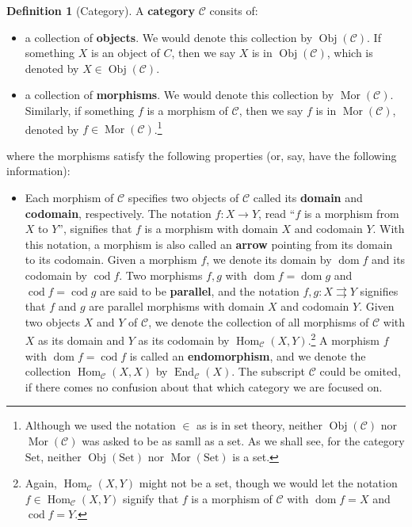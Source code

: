 \documentclass{article}
\theoremstyle{definition}
\newtheorem{definition}{Definition}[section]
\theoremstyle{definition}
\theoremstyle{remark}
\DeclareMathOperator{\Obj}{Obj}
\DeclareMathOperator{\Mor}{Mor}
\DeclareMathOperator{\dom}{dom}
\DeclareMathOperator{\cod}{cod}
\DeclareMathOperator{\Hom}{Hom}
\DeclareMathOperator{\End}{End}
\begin{document}
	\begin{definition}[Category]
	A \textbf{category} $\mathcal{C}$ consits of:
		\begin{itemize}
			\item a collection of \textbf{objects}. We would denote this collection by $\Obj(\mathcal{C})$. If something $X$ is an object of $C$, then we say $X$ is in $\Obj(\mathcal{C})$, which is denoted by $X\in\Obj(\mathcal{C})$.
			\item a collection of \textbf{morphisms}. We would denote this collection by $\Mor(\mathcal{C})$. Similarly, if something $f$ is a morphism of $\mathcal{C}$, then we say $f$ is in $\Mor(\mathcal{C})$, denoted by $f\in \Mor(\mathcal{C})$.\footnote{Although we used the notation $\in$ as is in set theory, neither $\Obj(\mathcal{C})$ nor $\Mor(\mathcal{C})$ was asked to be as samll as a set. As we shall see, for the category $\mathrm{Set}$, neither $\Obj(\mathrm{Set})$ nor $\Mor(\mathrm{Set})$ is a set.}
		\end{itemize}
	where the morphisms satisfy the following properties (or, say, have the following information):
		\begin{itemize}
			\item Each morphism of $\mathcal{C}$ specifies two objects of $\mathcal{C}$ called its \textbf{domain} and \textbf{codomain}, respectively. The notation $f:X\to Y$, read ``$f$ is a morphism from $X$ to $Y$'', signifies that $f$ is a morphism with domain $X$ and codomain $Y$. With this notation, a morphism is also called an \textbf{arrow} pointing from its domain to its codomain. Given a morphism $f$, we denote its domain by $\dom f$ and its codomain by $\cod f$. Two morphisms $f,g$ with $\dom f=\dom g$ and $\cod f=\cod g$ are said to be \textbf{parallel}, and the notation $f,g:X\rightrightarrows Y$ signifies that $f$ and $g$ are parallel morphisms with domain $X$ and codomain $Y$. Given two objects $X$ and $Y$ of $\mathcal{C}$, we denote the collection of all morphisms of $\mathcal{C}$ with $X$ as its domain and $Y$ as its codomain by $\Hom_\mathcal{C}(X,Y)$.\footnote{Again, $\Hom_\mathcal{C}(X,Y)$ might not be a set, though we would let the notation $f\in\Hom_\mathcal{C}(X,Y)$ signify that $f$ is a morphism of $\mathcal{C}$ with $\dom f=X$ and $\cod f=Y$.} A morphism $f$ with $\dom f=\cod f$ is called an \textbf{endomorphism}, and we denote the collection $\Hom_\mathcal{C}(X,X)$ by $\End_\mathcal{C}(X)$. The subscript $\mathcal{C}$ could be omited, if there comes no confusion about that which category we are focused on.

\end{itemize}
\end{definition}
\end{document}
